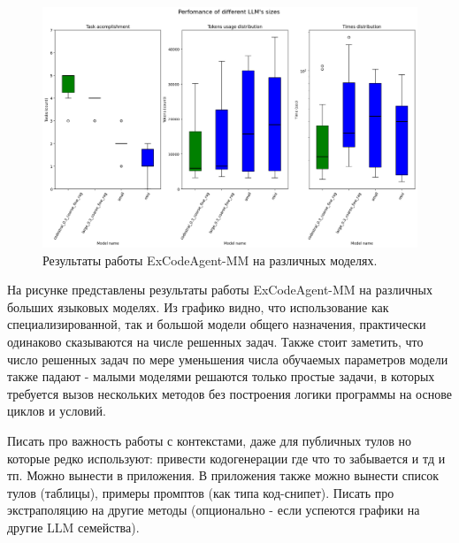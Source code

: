 \begin{figure}
    \center
	\includegraphics[scale=0.42]{sources/stats_2.png}
	\caption{Результаты работы ExCodeAgent-MM на различных моделях.} 
	\label{fig:ch4:llms}  
\end{figure}

На рисунке  представлены результаты работы ExCodeAgent-MM на 
различных больших языковых моделях. Из графико видно, что использование как 
специализированной, так и большой модели общего назначения, практически одинаково сказываются
на числе решенных задач. Также стоит заметить, что число решенных задач по мере уменьшения 
числа обучаемых параметров модели также падают - малыми моделями решаются только 
простые задачи, в которых требуется вызов нескольких методов без построения логики программы
на основе циклов и условий.


Писать про важность работы с контекстами, даже для публичных тулов но которые редко используют:
привести кодогенерации где что то забывается и тд и тп. Можно вынести в приложения.
В приложения также можно вынести список тулов (таблицы), примеры промптов 
(как типа код-снипет).
Писать про экстраполяцию на другие методы (опционально - если успеются графики на другие 
LLM семейства).

